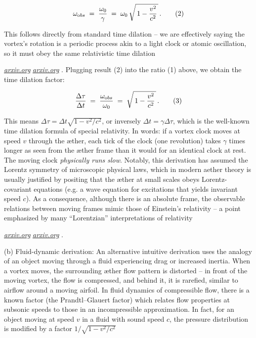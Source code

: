 \documentclass[aps,preprint,superscriptaddress]{revtex4}
\begin{document}
 \begin{equation}
\omega_{\textrm obs} \;=\; \frac{\omega_0}{\gamma} \;=\; \omega_0\,\sqrt{\,1-\frac{v^2}{c^2}\,}\,. \tag{2}
 \end{equation}

This follows directly from standard time dilation – we are effectively saying the vortex’s rotation is a periodic process akin to a light clock or atomic oscillation, so it must obey the same relativistic time dilation

\href{https://arxiv.org/pdf/physics/0611077#:~:text=This%20formula%20has%20the%20same,2%29%20of}{\textit{arxiv.org}}
\href{https://arxiv.org/pdf/physics/0611077#:~:text=relativity%20theory%2C%20but%20obviously%20its,light%20in%20all%20inertial%20frames}{\textit{arxiv.org}}
. Plugging result (2) into the ratio (1) above, we obtain the time dilation factor:

 \begin{equation}
\frac{\Delta \tau}{\Delta t} \;=\; \frac{\omega_{\textrm obs}}{\omega_0} \;=\; \sqrt{\,1-\frac{v^2}{c^2}\,}\,. \tag{3}
 \end{equation}

This means $\Delta \tau = \Delta t \sqrt{1-v^2/c^2}$, or inversely $\Delta t = \gamma \Delta \tau$, which is the well-known time dilation formula of special relativity. In words: if a vortex clock moves at speed $v$ through the æther, each tick of the clock (one revolution) takes $\gamma$ times longer as seen from the æther frame than it would for an identical clock at rest. The moving clock \textit{physically runs slow}. Notably, this derivation has assumed the Lorentz symmetry of microscopic physical laws, which in modern aether theory is usually justified by positing that the æther at small scales obeys Lorentz-covariant equations (e.g. a wave equation for excitations that yields invariant speed $c$). As a consequence, although there is an absolute frame, the observable relations between moving frames mimic those of Einstein’s relativity – a point emphasized by many “Lorentzian” interpretations of relativity

\href{https://arxiv.org/pdf/physics/0611077#:~:text=relativity%20theory%2C%20but%20obviously%20its,light%20in%20all%20inertial%20frames}{\textit{arxiv.org}}
\href{https://arxiv.org/pdf/physics/0611077#:~:text=We%20should%20note%20that%2C%20when,a%20state%20of%20absolute%20rest}{\textit{arxiv.org}}
.

(b) Fluid-dynamic derivation: An alternative intuitive derivation uses the analogy of an object moving through a fluid experiencing drag or increased inertia. When a vortex moves, the surrounding æther flow pattern is distorted – in front of the moving vortex, the flow is compressed, and behind it, it is rarefied, similar to airflow around a moving airfoil. In fluid dynamics of compressible flow, there is a known factor (the Prandtl–Glauert factor) which relates flow properties at subsonic speeds to those in an incompressible approximation. In fact, for an object moving at speed $v$ in a fluid with sound speed $c$, the pressure distribution is modified by a factor $1/\sqrt{1-v^2/c^2}$
\end{document}
